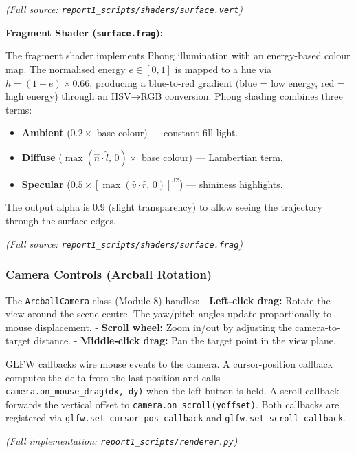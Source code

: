\documentclass[
  11pt,
]{report}
\providecommand{\tightlist}{%
  \setlength{\itemsep}{0pt}\setlength{\parskip}{0pt}}
\begin{document}
\emph{(Full source: \texttt{report1\_scripts/shaders/surface.vert})}

\textbf{Fragment Shader (\texttt{surface.frag}):}

The fragment shader implements Phong illumination with an energy-based
colour map. The normalised energy \(e \in [0,1]\) is mapped to a hue via
\(h = (1 - e) \times 0.66\), producing a blue-to-red gradient (blue =
low energy, red = high energy) through an HSV→RGB conversion. Phong
shading combines three terms:

\begin{itemize}
\tightlist
\item
  \textbf{Ambient} (\(0.2 \times\) base colour) --- constant fill light.
\item
  \textbf{Diffuse} (\(\max(\hat{n} \cdot \hat{l},\, 0) \times\) base
  colour) --- Lambertian term.
\item
  \textbf{Specular}
  (\(0.5 \times [\max(\hat{v} \cdot \hat{r},\, 0)]^{32}\)) --- shininess
  highlights.
\end{itemize}

The output alpha is \(0.9\) (slight transparency) to allow seeing the
trajectory through the surface edges.

\emph{(Full source: \texttt{report1\_scripts/shaders/surface.frag})}

\subsubsection{Camera Controls (Arcball
Rotation)}\label{camera-controls-arcball-rotation}

The \texttt{ArcballCamera} class (Module 8) handles: -
\textbf{Left-click drag:} Rotate the view around the scene centre. The
yaw/pitch angles update proportionally to mouse displacement. -
\textbf{Scroll wheel:} Zoom in/out by adjusting the camera-to-target
distance. - \textbf{Middle-click drag:} Pan the target point in the view
plane.

GLFW callbacks wire mouse events to the camera. A cursor-position
callback computes the delta from the last position and calls
\texttt{camera.on\_mouse\_drag(dx,\ dy)} when the left button is held. A
scroll callback forwards the vertical offset to
\texttt{camera.on\_scroll(yoffset)}. Both callbacks are registered via
\texttt{glfw.set\_cursor\_pos\_callback} and
\texttt{glfw.set\_scroll\_callback}.

\emph{(Full implementation: \texttt{report1\_scripts/renderer.py})}
\end{document}
